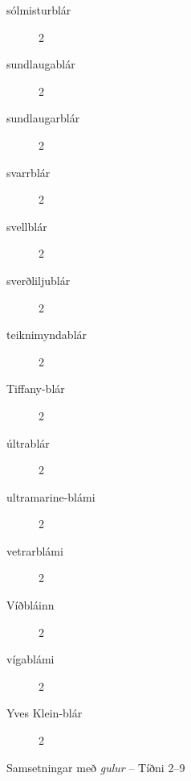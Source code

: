 \documentclass[../samsetningasafn.tex]{subfiles}
\begin{document}
\begin{bigwordlist}
\begin{footnotesize}
\begin{multicols}{4}
\begin{description}
		\item [sólmisturblár]	2
		\item [sundlaugablár]	2
		\item [sundlaugarblár]	2
		\item [svarrblár]		2
		\item [svellblár]		2
		\item [sverðliljublár]		2
		\item [teiknimyndablár]		2
		\item [Tiffany-blár]		2
		\item [últrablár]		2
		\item [ultramarine-blámi]	2
		\item [vetrarblámi]		2
		\item [Víðbláinn]		2
		\item [vígablámi]	2
		\item [Yves Klein-blár]	2
	\end{description}
\end{multicols}
\end{footnotesize}
	
\label{listi:blar9}
\caption{Samsetningar með \textit{gulur} -- Tíðni 2--9}
\end{bigwordlist}
\end{document}
